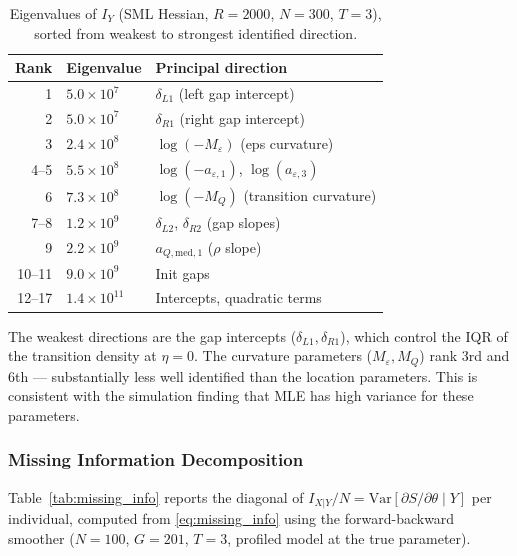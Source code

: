 \documentclass[12pt]{article}
\begin{document}
\begin{table}[H]
\centering
\caption{Eigenvalues of $I_Y$ (SML Hessian, $R = 2000$, $N = 300$, $T = 3$),
sorted from weakest to strongest identified direction.}
\label{tab:eigenvalues}
\begin{tabular}{rll}
\toprule
Rank & Eigenvalue & Principal direction \\
\midrule
1 & $5.0 \times 10^7$ & $\delta_{L1}$ (left gap intercept) \\
2 & $5.0 \times 10^7$ & $\delta_{R1}$ (right gap intercept) \\
3 & $2.4 \times 10^8$ & $\log(-M_\varepsilon)$ (eps curvature) \\
4--5 & $5.5 \times 10^8$ & $\log(-a_{\varepsilon,1})$, $\log(a_{\varepsilon,3})$ \\
6 & $7.3 \times 10^8$ & $\log(-M_Q)$ (transition curvature) \\
7--8 & $1.2 \times 10^9$ & $\delta_{L2}$, $\delta_{R2}$ (gap slopes) \\
9 & $2.2 \times 10^9$ & $a_{Q,\text{med},1}$ ($\rho$ slope) \\
10--11 & $9.0 \times 10^9$ & Init gaps \\
12--17 & $1.4 \times 10^{11}$ & Intercepts, quadratic terms \\
\bottomrule
\end{tabular}
\end{table}

The weakest directions are the gap intercepts ($\delta_{L1}, \delta_{R1}$),
which control the IQR of the transition density at $\eta = 0$.
The curvature parameters ($M_\varepsilon, M_Q$) rank 3rd and 6th ---
substantially less well identified than the location parameters.
This is consistent with the simulation finding that MLE has high variance
for these parameters.

\subsubsection*{Missing Information Decomposition}

Table~\ref{tab:missing_info} reports the diagonal of
$I_{X|Y} / N = \text{Var}[\partial S / \partial \theta \mid Y]$ per individual,
computed from \eqref{eq:missing_info} using the forward-backward smoother
($N = 100$, $G = 201$, $T = 3$, profiled model at the true parameter).
\end{document}
